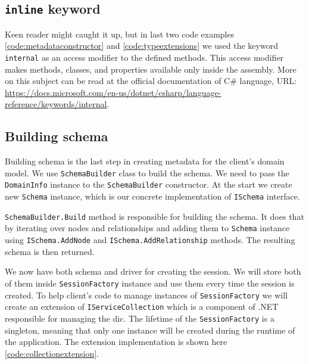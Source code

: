 \subsection{\texttt{inline} keyword}

Keen reader might caught it up, but in last two code examples \ref{code:metadataconstructor} and \ref{code:typeextensions} we used the keyword \texttt{internal}
as an access modifier to the defined methods. This access modifier makes methods, classes, and properties available only inside the assembly. More on this subject
can be read at the official documentation of C\# language, URL: \url{https://docs.microsoft.com/en-us/dotnet/csharp/language-reference/keywords/internal}.

\subsection {Building schema}

Building schema is the last step in creating metadata for the client's domain model.
We use \texttt{SchemaBuilder} class to build the schema. We need to pass the \texttt{DomainInfo} instance to the \texttt{SchemaBuilder} constructor.
At the start we create new \texttt{Schema} instance, which is our concrete implementation of \texttt{ISchema} interface.

\texttt{SchemaBuilder.Build} method is responsible for building the schema. It does that by iterating over nodes and relationships and adding them to \texttt{Schema} instance
using \texttt{ISchema.AddNode} and \texttt{ISchema.AddRelationship} methods. The resulting schema is then returned.

We now have both schema and driver for creating the session. We will store both of them inside \texttt{SessionFactory} instance
and use them every time the session is created. To help client's code to manage instances of \texttt{SessionFactory} we will create an extension
of \texttt{IServiceCollection} which is a component of .NET responsible for managing the \acrfull{dic}. The lifetime of the \texttt{SessionFactory} is
a singleton, meaning that only one instance will be created during the runtime of the application. The extension implementation is shown here \ref{code:collectionextension}.


